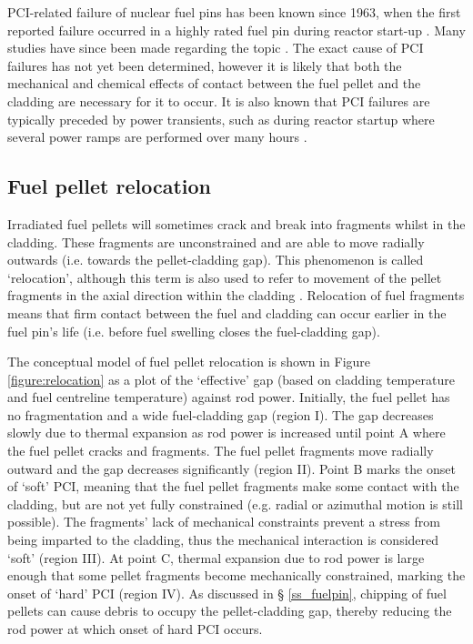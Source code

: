 PCI-related failure of nuclear fuel pins has been known since 1963, when the first reported failure occurred in a highly rated fuel pin during reactor start-up \cite{lyons1963high}. Many studies have since been made regarding the topic \cite{alam2011review, bcoxpelletclad1990}. The exact cause of PCI failures has not yet been determined, however it is likely that both the mechanical and chemical effects of contact between the fuel pellet and the cladding are necessary for it to occur. It is also known that PCI failures are typically preceded by power transients, such as during reactor startup where several power ramps are performed over many hours \cite{bcoxpelletclad1990}.

\subsection{Fuel pellet relocation}

Irradiated fuel pellets will sometimes crack and break into fragments whilst in the cladding. These fragments are unconstrained and are able to move radially outwards (i.e. towards the pellet-cladding gap). This phenomenon is called `relocation', although this term is also used to refer to movement of the pellet fragments in the axial direction within the cladding \cite{sheppard1982data}. Relocation of fuel fragments means that firm contact between the fuel and cladding can occur earlier in the fuel pin's life (i.e. before fuel swelling closes the fuel-cladding gap).

The conceptual model of fuel pellet relocation is shown in Figure \ref{figure:relocation} as a plot of the `effective' gap (based on cladding temperature and fuel centreline temperature) against rod power. Initially, the fuel pellet has no fragmentation and a wide fuel-cladding gap (region I). The gap decreases slowly due to thermal expansion as rod power is increased until point A where the fuel pellet cracks and fragments. The fuel pellet fragments move radially outward and the gap decreases significantly (region II). Point B marks the onset of `soft' PCI, meaning that the fuel pellet fragments make some contact with the cladding, but are not yet fully constrained (e.g. radial or azimuthal motion is still possible). The fragments' lack of mechanical constraints prevent a stress from being imparted to the cladding, thus the mechanical interaction is considered `soft' (region III). At point C, thermal expansion due to rod power is large enough that some pellet fragments become mechanically constrained, marking the onset of `hard' PCI (region IV). As discussed in § \ref{ss_fuelpin}, chipping of fuel pellets can cause debris to occupy the pellet-cladding gap, thereby reducing the rod power at which onset of hard PCI occurs.


